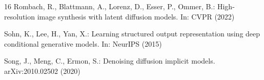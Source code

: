 \documentclass[runningheads]{llncs}
\begin{document}
\begin{thebibliography}{16}
Rombach, R., Blattmann, A., Lorenz, D., Esser, P., Ommer, B.:
High-resolution image synthesis with latent diffusion models.
In: CVPR (2022)

Sohn, K., Lee, H., Yan, X.: Learning structured output representation using
deep conditional generative models. In: NeurIPS (2015)

Song, J., Meng, C., Ermon, S.:
Denoising diffusion implicit models. arXiv:2010.02502 (2020)

\end{thebibliography}
\end{document}
